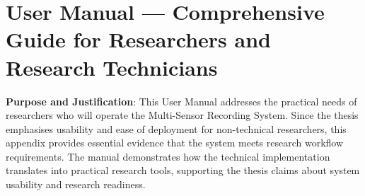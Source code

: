 \chapter{User Manual — Comprehensive Guide for Researchers and Research Technicians}

\textbf{Purpose and Justification}: This User Manual addresses the practical needs of researchers who will operate the Multi-Sensor Recording System. Since the thesis emphasises usability and ease of deployment for non-technical researchers, this appendix provides essential evidence that the system meets research workflow requirements. The manual demonstrates how the technical implementation translates into practical research tools, supporting the thesis claims about system usability and research readiness.


